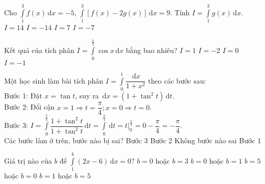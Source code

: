 \begin{ex}%
	Cho $\displaystyle\int\limits_1^3 f(x)\mathrm{\,d}x=-5$, $\displaystyle\int\limits_1^3[f(x)-2g(x)]\mathrm{\,d}x=9$. Tính $I=\displaystyle\int\limits_1^3 g(x)\mathrm{\,d}x$. 
	\choice
	{$I=14$}
	{$I=-14$}
	{$I=7$}
	{\True $I=-7$}
\end{ex}
\begin{ex}%
	Kết quả của tích phân $I=\displaystyle\int\limits_0^{\frac{\pi}{2}}\cos x\mathrm{\,d}x$ bằng bao nhiêu?
	\choice
	{\True $I=1$}
	{$I=-2$}
	{$I=0$}
	{$I=-1$}
\end{ex}
\begin{ex}%
	Một học sinh làm bài tích phân $I=\displaystyle\int\limits_0^1\dfrac{\mathrm{\,d}x}{1+x^2}$ theo các bước sau:\\
	Bước 1: Đặt $x=\tan t$, suy ra $\mathrm{\,d}x=\left(1+\tan^2t\right)\mathrm{\,d}t$.\\
	Bước 2: Đổi cận $x=1\Rightarrow t=\dfrac{\pi}{4}; x=0\Rightarrow t=0$.\\
	Bước 3: $I=\displaystyle\int\limits_0^{\frac{\pi}{4}}\dfrac{1+\tan^2t}{1+\tan^2t}\mathrm{\,d}t=\displaystyle\int\limits_0^{\frac{\pi}{4}}\mathrm{\,d}t= t\bigg|_0^{\frac{\pi}{4}}=0-\dfrac{\pi}{4}=-\dfrac{\pi}{4}$.\\
	Các bước làm ở trên, bước nào bị sai?
	\choice
	{\True Bước 3}
	{Bước 2}
	{Không bước nào sai}
	{Bước 1}
\end{ex}
\begin{ex}%
	Giá trị nào của $b$ để $\displaystyle\int\limits_1^b(2x-6)\mathrm{\,d}x=0$?
	\choice
	{$b=0$ hoặc $b=3$}
	{$b=0$ hoặc $b=1$}
	{$b=5$ hoặc $b=0$}
	{\True $b=1$ hoặc $b=5$}
\end{ex}
